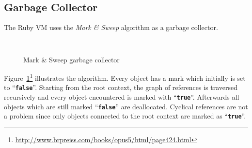 \documentclass[12pt,a4paper,oneside,openright]{book}
\newcommand{\fig}[1]{Figure~\ref{fig:#1}}
\newcommand{\code}[1]{``\texttt{\textbf{\textcolor{codegray}{\small{#1}}}}''}
\begin{document}
\begin{CJK}{UTF8}{}
\subsection{Garbage Collector}
The Ruby \ac{VM} uses the \emph{Mark \& Sweep} algorithm as a garbage collector.
\begin{figure}[htbp]
  \begin{center}
    \\
    \caption{Mark \& Sweep garbage collector\label{fig:marknsweep}}
  \end{center}
\end{figure}
\fig{marknsweep}\footnote{\url{http://www.brpreiss.com/books/opus5/html/page424.html}} illustrates the algorithm. Every object has a mark which initially is set to \code{false}. Starting from the root context, the graph of references is traversed recursively and every object encountered is marked with \code{true}. Afterwards all objects which are still marked \code{false} are deallocated. Cyclical references are not a problem since only objects connected to the root context are marked as \code{true}.


\end{CJK}
\end{document}
